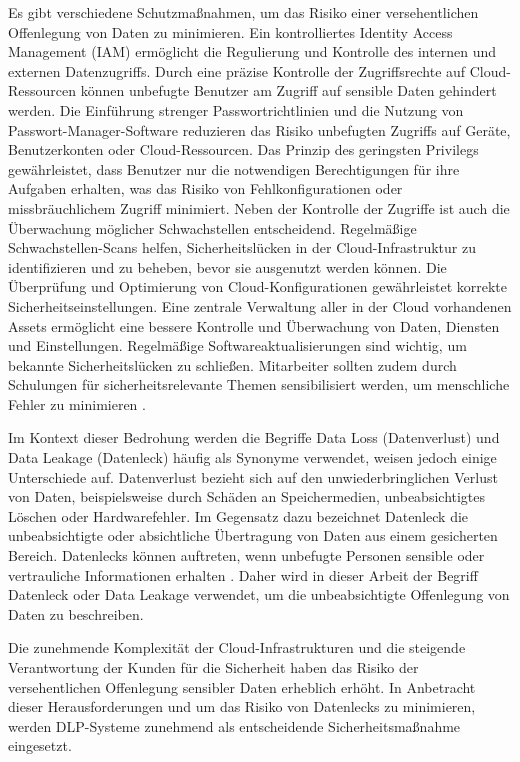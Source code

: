 Es gibt verschiedene Schutzmaßnahmen, um das Risiko einer versehentlichen Offenlegung von Daten zu minimieren. Ein kontrolliertes Identity Access Management (IAM) ermöglicht die Regulierung und Kontrolle des internen und externen Datenzugriffs. Durch eine präzise Kontrolle der Zugriffsrechte auf Cloud-Ressourcen können unbefugte Benutzer am Zugriff auf sensible Daten gehindert werden. Die Einführung strenger Passwortrichtlinien und die Nutzung von Passwort-Manager-Software reduzieren das Risiko unbefugten Zugriffs auf Geräte, Benutzerkonten oder Cloud-Ressourcen. Das Prinzip des geringsten Privilegs gewährleistet, dass Benutzer nur die notwendigen Berechtigungen für ihre Aufgaben erhalten, was das Risiko von Fehlkonfigurationen oder missbräuchlichem Zugriff minimiert. Neben der Kontrolle der Zugriffe ist auch die Überwachung möglicher Schwachstellen entscheidend. Regelmäßige Schwachstellen-Scans helfen, Sicherheitslücken in der Cloud-Infrastruktur zu identifizieren und zu beheben, bevor sie ausgenutzt werden können. Die Überprüfung und Optimierung von Cloud-Konfigurationen gewährleistet korrekte Sicherheitseinstellungen. Eine zentrale Verwaltung aller in der Cloud vorhandenen Assets ermöglicht eine bessere Kontrolle und Überwachung von Daten, Diensten und Einstellungen.  Regelmäßige Softwareaktualisierungen sind wichtig, um bekannte Sicherheitslücken zu schließen. Mitarbeiter sollten zudem durch Schulungen für sicherheitsrelevante Themen sensibilisiert werden, um menschliche Fehler zu minimieren \cite{Brindha.2015}.

Im Kontext dieser Bedrohung werden die Begriffe Data Loss (Datenverlust) und Data Leakage (Datenleck) häufig als Synonyme verwendet, weisen jedoch einige Unterschiede auf. Datenverlust bezieht sich auf den unwiederbringlichen Verlust von Daten, beispielsweise durch Schäden an Speichermedien, unbeabsichtigtes Löschen oder Hardwarefehler. Im Gegensatz dazu bezeichnet Datenleck die unbeabsichtigte oder absichtliche Übertragung von Daten aus einem gesicherten Bereich. Datenlecks können auftreten, wenn unbefugte Personen sensible oder vertrauliche Informationen erhalten \cite{Proofpoint.2021b}. Daher wird in dieser Arbeit der Begriff Datenleck oder Data Leakage verwendet, um die unbeabsichtigte Offenlegung von Daten zu beschreiben.

Die zunehmende Komplexität der Cloud-Infrastrukturen und die steigende Verantwortung der Kunden für die Sicherheit haben das Risiko der versehentlichen Offenlegung sensibler Daten erheblich erhöht. In Anbetracht dieser Herausforderungen und um das Risiko von Datenlecks zu minimieren, werden DLP-Systeme zunehmend als entscheidende Sicherheitsmaßnahme eingesetzt.


